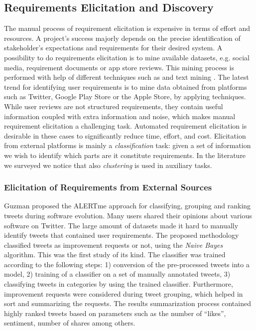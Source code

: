 \subsection{Requirements Elicitation and Discovery}

The manual process of requirement elicitation is expensive in terms of effort
and resources. A project's success majorly depends on the precise identification
of stakeholder's expectations and requirements for their desired system. A
possibility to do requirements elicitation is to mine available datasets, e.g.
social media, requirement documents or  app store reviews. This mining process
is performed with help of different techniques such as \NLP and text mining
\cite{Hollis2017}\cite{dong2010}. The latest trend for identifying
user requirements is to mine data obtained from platforms such as Twitter,
Google Play Store or the Apple Store, by applying \ML techniques. While user
reviews are not structured requirements, they contain useful information
coupled with extra information and noise, which makes manual requirement
elicitation a challenging task. Automated requirement elicitation is desirable
in these cases to significantly reduce time, effort, and cost. Elicitation from
external platforms is mainly a \ML \emph{classification} task: given a set of
information we wish to identify which parts are it constitute requirements. In
the literature we surveyed we notice that also \emph{clustering} is used in
auxiliary tasks.

\subsubsection{Elicitation of Requirements from External Sources}

Guzman \etal \cite{Guzman:2017} proposed the ALERTme approach for classifying,
grouping and ranking tweets during software evolution. Many users shared their
opinions about various software on Twitter. The large amount of datasets made it
hard to manually identify tweets that contained user requirements. The proposed
methodology classified tweets as improvement requests or not, using the
\emph{Naive Bayes} algorithm. This was the first study of its kind.
The classifier was trained according to the following steps: 1) conversion of
the pre-processed tweets into a \VSM model, 2) training of a classifier on a set
of manually annotated tweets, 3) classifying tweets in categories by using the
trained classifier. Furthermore, improvement requests were considered during
tweet grouping, which helped in sort and summarizing the requests. The
results summarization process contained highly ranked tweets based on
parameters such as the number of ``likes'', sentiment, number of shares among
others.

